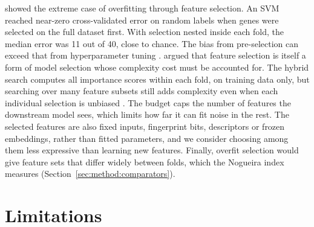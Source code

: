 \citet{Ambroise2002} showed the extreme case of overfitting through feature selection. An SVM reached near-zero cross-validated error on random labels when genes were selected on the full dataset first. With selection nested inside each fold, the median error was 11 out of 40, close to chance. The bias from pre-selection can exceed that from hyperparameter tuning \citep{Vabalas2019}. \citet{Cawley2010} argued that feature selection is itself a form of model selection whose complexity cost must be accounted for. The hybrid search computes all importance scores within each fold, on training data only, but searching over many feature subsets still adds complexity even when each individual selection is unbiased \citep{Tibshirani2015}. The budget caps the number of features the downstream model sees, which limits how far it can fit noise in the rest. The selected features are also fixed inputs, fingerprint bits, descriptors or frozen embeddings, rather than fitted parameters, and we consider choosing among them less expressive than learning new features. Finally, overfit selection would give feature sets that differ widely between folds, which the Nogueira index measures (Section~\ref{sec:method:comparators}).

\section{Limitations}\label{sec:method:limitations}


